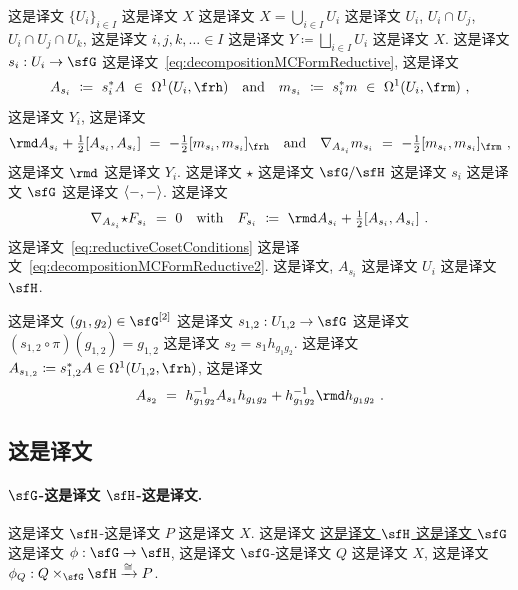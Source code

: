 \documentclass[
    affil-it, %
    auth-lg, %
    british, %
    compression, %
    contents, %
    custom-packages={}, %
    references={bigone}, %
]{lib/preprint}
\begin{document}
\begin{body}
 这是译文 $\{U_i\}_{i\in I}$ 这是译文 $X$ 这是译文 $X=\bigcup_{i\in I}U_i$ 这是译文 $U_i$, $U_i\cap U_j$, $U_i\cap U_j\cap U_k$, 这是译文 $i,j,k,\ldots\in I$ 这是译文 $Y\coloneqq\bigsqcup_{i\in I}U_i$ 这是译文 $X$. 这是译文 $s_i:U_i\rightarrow\sfG$ 这是译文~\eqref{eq:decompositionMCFormReductive}, 这是译文         \begin{equation}\label{eq:canonicalConnection}
            A_{s_i}\ \coloneqq\ s_i^*A\ \in\ \Omega^1(U_i,\frh)
            \eand
            m_{s_i}\ \coloneqq\ s_i^*m\ \in\ \Omega^1(U_i,\frm)~,
        \end{equation}  这是译文 $Y_i$, 这是译文         \begin{equation}\label{eq:decompositionMCFormReductive2}
            \rmd A_{s_i}+\tfrac12[A_{s_i},A_{s_i}]\ =\ -\tfrac12[m_{s_i},m_{s_i}]_\frh
            \eand
            \nabla_{A_{s_i}}m_{s_i}\ =\ -\tfrac12[m_{s_i},m_{s_i}]_\frm~,
        \end{equation}  这是译文 $\rmd$ 这是译文 $Y_i$. 这是译文 $\star$ 这是译文 $\sfG/\sfH$ 这是译文 ${s_i}$ 这是译文 $\sfG$ 这是译文 $\langle-,-\rangle$. 这是译文  ~\cite{Trautman:1977im,Harnad:1980ct}         \begin{equation}\label{eq:canonicalCurvature}
            \nabla_{A_{s_i}}{\star}F_{s_i}\ =\ 0
            \ewith
            F_{s_i}\ \coloneqq\ \rmd A_{s_i}+\tfrac12[A_{s_i},A_{s_i}]~.
        \end{equation}  这是译文~\eqref{eq:reductiveCosetConditions} 这是译文~\eqref{eq:decompositionMCFormReductive2}. 这是译文, $A_{s_i}$ 这是译文 $U_i$ 这是译文 $\sfH$. 
        
这是译文 $(g_1,g_2)\in\sfG^{[2]}$ 这是译文 $s_{1,2}:U_{1,2}\rightarrow\sfG$ 这是译文 $(s_{1,2}\circ\pi)(g_{1,2})=g_{1,2}$ 这是译文 $s_2=s_1h_{g_1g_2}$. 这是译文 $A_{s_{1,2}}\coloneqq s_{1,2}^*A\in\Omega^1(U_{1,2},\frh)$, 这是译文         \begin{equation}
            A_{s_2}\ =\ h^{-1}_{g_1g_2}A_{s_1}h_{g_1g_2}+h^{-1}_{g_1g_2}\rmd h_{g_1g_2}~.
        \end{equation}
        
        \subsection{这是译文}\label{app:group_structures}
        
        \paragraph{$\sfG$-这是译文 $\sfH$-这是译文.}  这是译文 $\sfH$-这是译文 $P$ 这是译文 $X$. 这是译文 \uline{这是译文 $\sfH$ 这是译文 $\sfG$} 这是译文 $\phi:\sfG\rightarrow\sfH$, 这是译文 $\sfG$-这是译文 $Q$ 这是译文 $X$, 这是译文 $\phi_Q:Q\times_\sfG\sfH\xrightarrow{\cong}P$.
        

\end{body}
\end{document}
